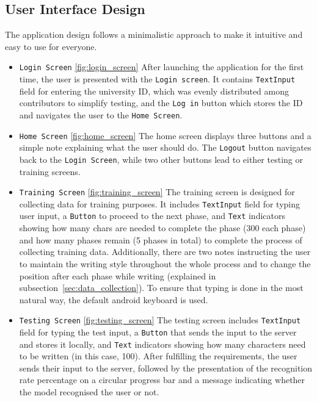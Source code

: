 \subsection{User Interface Design}
The application design follows a minimalistic approach to make it intuitive and easy to use for everyone. 
\begin{itemize}
	\item 
	\texttt{Login Screen} \ref{fig:login_screen} \newline
	After launching the application for the first time, the user is presented with the \texttt{Login screen}. It contains \texttt{TextInput} field for entering the university ID, which was evenly distributed among contributors to simplify testing, and the \texttt{Log in} button which stores the ID and navigates the user to the \texttt{Home Screen}.
	\item 
	\texttt{Home Screen} \ref{fig:home_screen} \newline
	The home screen displays three buttons and a simple note explaining what the user should do. The \texttt{Logout} button navigates back to the \texttt{Login Screen}, while two other buttons lead to either testing or training screens.
	\item 
	\texttt{Training Screen} \ref{fig:training_screen} \newline
	The training screen is designed for collecting data for training purposes. It includes \texttt{TextInput} field for typing user input, a \texttt{Button} to proceed to the next phase, and \texttt{Text} indicators showing how many chars are needed to complete the phase (300 each phase) and how many phases remain (5 phases in total) to complete the process of collecting training data. Additionally, there are two notes instructing the user to maintain the writing style throughout the whole process and to change the position after each phase while writing (explained in subsection~\ref{sec:data_collection}). \newline
	To ensure that typing is done in the most natural way, the default android keyboard is used. 
	\item 
	\texttt{Testing Screen} \ref{fig:testing_screen} \newline
	The testing screen includes \texttt{TextInput} field for typing the test input, a \texttt{Button} that sends the input to the server and stores it locally, and \texttt{Text} indicators showing how many characters need to be written (in this case, 100). After fulfilling the requirements, the user sends their input to the server, followed by the presentation of the recognition rate percentage on a circular progress bar and a message indicating whether the model recognised the user or not. 
\end{itemize}


